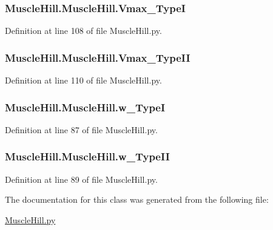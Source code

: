 \subsubsection[{\texorpdfstring{Vmax\+\_\+\+TypeI}{Vmax_TypeI}}]{\setlength{\rightskip}{0pt plus 5cm}Muscle\+Hill.\+Muscle\+Hill.\+Vmax\+\_\+\+TypeI}\hypertarget{class_muscle_hill_1_1_muscle_hill_a8e9ac9cc4baa53a7d92d6d70ae1e21b8}{}\label{class_muscle_hill_1_1_muscle_hill_a8e9ac9cc4baa53a7d92d6d70ae1e21b8}


Definition at line 108 of file Muscle\+Hill.\+py.

\subsubsection[{\texorpdfstring{Vmax\+\_\+\+Type\+II}{Vmax_TypeII}}]{\setlength{\rightskip}{0pt plus 5cm}Muscle\+Hill.\+Muscle\+Hill.\+Vmax\+\_\+\+Type\+II}\hypertarget{class_muscle_hill_1_1_muscle_hill_ab5a1774d46cec18a9b0447c5b7c8c4d9}{}\label{class_muscle_hill_1_1_muscle_hill_ab5a1774d46cec18a9b0447c5b7c8c4d9}


Definition at line 110 of file Muscle\+Hill.\+py.

\subsubsection[{\texorpdfstring{w\+\_\+\+TypeI}{w_TypeI}}]{\setlength{\rightskip}{0pt plus 5cm}Muscle\+Hill.\+Muscle\+Hill.\+w\+\_\+\+TypeI}\hypertarget{class_muscle_hill_1_1_muscle_hill_a9090fed9dd51dcd21e4440e78b7e19e6}{}\label{class_muscle_hill_1_1_muscle_hill_a9090fed9dd51dcd21e4440e78b7e19e6}


Definition at line 87 of file Muscle\+Hill.\+py.

\subsubsection[{\texorpdfstring{w\+\_\+\+Type\+II}{w_TypeII}}]{\setlength{\rightskip}{0pt plus 5cm}Muscle\+Hill.\+Muscle\+Hill.\+w\+\_\+\+Type\+II}\hypertarget{class_muscle_hill_1_1_muscle_hill_a9a0066f990fa6f90dd7f0b1eedef9d0c}{}\label{class_muscle_hill_1_1_muscle_hill_a9a0066f990fa6f90dd7f0b1eedef9d0c}


Definition at line 89 of file Muscle\+Hill.\+py.



The documentation for this class was generated from the following file\+:\begin{DoxyCompactItemize}
\item 
\hyperlink{_muscle_hill_8py}{Muscle\+Hill.\+py}\end{DoxyCompactItemize}

